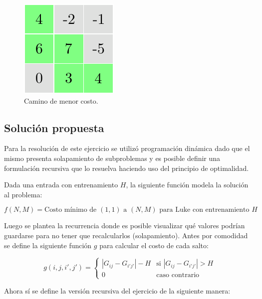 	\begin{figure}[H]
		\centering
		\includegraphics{imagenes/ej3_grilla_1.pdf}
		\caption{Camino de menor costo.}
	\end{figure}

    \subsection{Solución propuesta}

	Para la resolución de este ejercicio se utilizó programación dinámica dado
	que el mismo presenta solapamiento de subproblemas y es posible definir una
	formulación recursiva que lo resuelva haciendo uso del principio de
	optimalidad.

	Dada una entrada con entrenamiento $H$, la siguiente función modela la solución al
	problema:

	\begin{equation*}
		f(N, M) = \text{Costo mínimo de $(1, 1)$ a $(N, M)$ para Luke con entrenamiento $H$}
	\end{equation*}

	Luego se plantea la recurrencia donde es posible visualizar qué valores
	podrían guardarse para no tener que recalcularlos (solapamiento).
	Antes por comodidad se define la siguiente función $g$ para calcular el costo de cada salto:

	\begin{equation*}
		g(i, j, i', j') =
		\begin{cases}
			|G_{ij} - G_{i'j'}| - H & \text{si } |G_{ij} - G_{i'j'}| > H \\
			0 & \text{caso contrario}
		\end{cases}
	\end{equation*}

	Ahora sí se define la versión recursiva del ejercicio de la siguiente manera:

